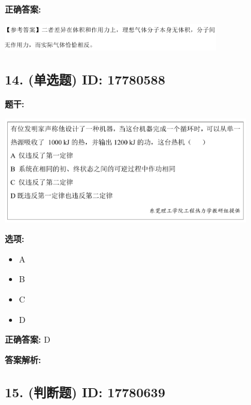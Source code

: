 \documentclass[12pt]{article}
\begin{document}
\textbf{正确答案:}

\begin{center}\includegraphics[width=0.7\textwidth, height=0.2\textheight, keepaspectratio]{question_13_17780575/correct_answer_1_img_1.png}\end{center}

\vspace{0.5em}\hrulefill\vspace{1em}

\subsection*{14. (单选题) \small ID: 17780588}

\textbf{题干:}


\begin{center}\includegraphics[width=0.8\textwidth, height=0.25\textheight, keepaspectratio]{question_14_17780588/title_img_1.png}\end{center}

\textbf{选项:}
\begin{itemize}[leftmargin=*]
  \item A

  \item B

  \item C

  \item D

\end{itemize}

\textbf{正确答案:}
D

\textbf{答案解析:}



\vspace{0.5em}\hrulefill\vspace{1em}

\subsection*{15. (判断题) \small ID: 17780639}
\end{document}
